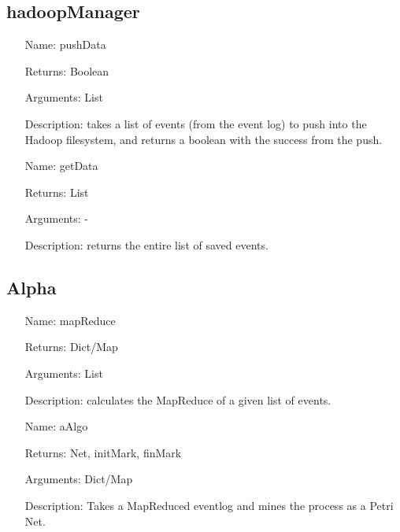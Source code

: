 \documentclass[runningheads]{llncs}
\begin{document}
\subsection{hadoopManager}
\begin{itemize}
\item[Name:] pushData
\item[Returns:] Boolean
\item[Arguments:] List
\item[Description:] takes a list of events (from the event log) to push into the Hadoop filesystem, and returns a boolean with the success from the push.
\end{itemize}

\begin{itemize}
\item[Name:] getData
\item[Returns:] List
\item[Arguments:] -
\item[Description:] returns the entire list of saved events.
\end{itemize}

\subsection{Alpha}
\begin{itemize}
\item[Name:] mapReduce
\item[Returns:] Dict/Map
\item[Arguments:] List
\item[Description:] calculates the MapReduce of a given list of events.
\end{itemize}

\begin{itemize}
\item[Name:] aAlgo
\item[Returns:] Net, initMark, finMark
\item[Arguments:] Dict/Map
\item[Description:] Takes a MapReduced eventlog and mines the process as a Petri Net.
\end{itemize}
\end{document}
